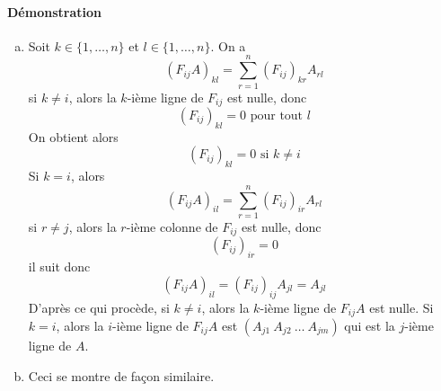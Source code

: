 \paragraph{Démonstration}
\begin{enumerate}[a)]
  \item Soit $k \in \{1, \ldots, n \}$ et $l \in \{1, \ldots, n \}$. On a
    $$(F_{ij} A)_{k l} = \sum_{r = 1}^{n} (F_{i j})_{k r} A_{r l}$$
    si $k\neq i$, alors la $k$-ième ligne de $F_{i j}$ est nulle, donc
    $$(F_{i j})_{k l}=0 \text{ pour tout } l$$
    On obtient alors
    $$(F_{i j})_{k l}=0 \text{ si } k\neq i$$
    Si $k=i$, alors 
    $$(F_{i j} A)_{i l} = \sum_{r = 1}^{n} (F_{i j})_{i r}A_{r l}$$
    si $r \neq j$, alors la $r$-ième colonne de $F_{i j}$ est nulle, donc
    $$(F_{ij})_{i r} = 0$$
    il suit donc
    $$(F_{i j} A)_{i l} = (F_{i j})_{i j} A_{j l} =A_{j l}$$
    D'après ce qui procède, si $k \neq i$, alors la $k$-ième ligne de $F_{i j}A$ est nulle. Si $k = i$, alors la $i$-ième ligne de $F_{i j} A$ est $(A_{j 1} ~ A_{j 2} ~ \ldots ~ A_{j m})$ qui est la $j$-ième ligne de $A$.

  \item Ceci se montre de façon similaire.
\end{enumerate}

